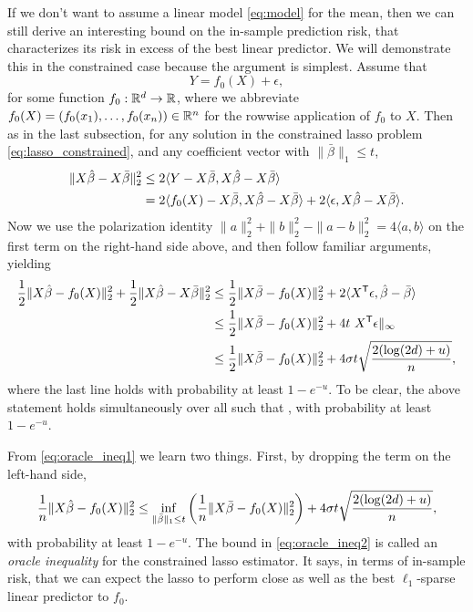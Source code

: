 \documentclass{article}
\begin{document}
If we don't want to assume a linear model \eqref{eq:model} for the mean, then we
can still derive an interesting bound on the in-sample prediction risk, that
characterizes its risk in excess of the best linear predictor. We will
demonstrate this in the constrained case because the argument is
simplest. Assume that 
\[
Y = f_0(X) + \epsilon,
\]  
for some function $f_0 : \mathbb{R}^d \to \mathbb{R}$, where we abbreviate $f_0(X) = (f_0(x_1),
\dots, f_0(x_n)) \in \mathbb{R}^n$ for the rowwise application of $f_0$ to $X$. Then as
in the last subsection, for any solution \smash{$\hbeta$} in the constrained
lasso problem \eqref{eq:lasso_constrained}, and any coefficient vector
\smash{$\bar\beta$} with $\|\bar\beta\|_1 \leq t$,  
\begin{align*}
\|X\hat{\beta} - X\bar\beta\|_2^2 
&\leq 2 \langle Y-X\bar\beta, X\hat{\beta} - X\bar\beta \rangle \\
&= 2 \langle f_0(X) - X\bar\beta, X\hat{\beta} - X\bar\beta \rangle + 
2 \langle \epsilon, X\hat{\beta} - X\bar\beta \rangle.
\end{align*}
Now we use the polarization identity $\|a\|_2^2+\|b\|_2^2-\|a-b\|_2^2 = 4\langle   
a,b\rangle$ on the first term on the right-hand side above, and then follow
familiar arguments, yielding  
\begin{align}
\nonumber
\frac{1}{2} \|X\hbeta - f_0(X)\|_2^2 + \frac{1}{2} \|X\hbeta - X\bar\beta\|_2^2
&\leq \frac{1}{2} \|X\bar\beta - f_0(X)\|_2^2 + 2 \langle X^\T \epsilon, \hbeta 
- \bar\beta \rangle \\
\nonumber
&\leq \frac{1}{2} \|X\bar\beta - f_0(X)\|_2^2 + 4t \ X^\T\epsilon\|_\infty \\
\label{eq:oracle_ineq1}
&\leq \frac{1}{2} \|X\bar\beta - f_0(X)\|_2^2 + 4 \sigma t \sqrt{\frac{2
   (\log(2d) + u)}{n}},   
\end{align}
where the last line holds with probability at least $1-e^{-u}$. To be clear, the
above statement holds simultaneously over all \smash{$\bar\beta$} such that 
, with probability at least $1-e^{-u}$.

From \eqref{eq:oracle_ineq1} we learn two things. First, by dropping the term
 on the left-hand side, 
\begin{equation}
\label{eq:oracle_ineq2}
\frac{1}{n} \|X\hat{\beta} - f_0(X)\|_2^2 \leq \inf_{\|\bar\beta\|_1 \leq t} \bigg(
\frac{1}{n} \|X\bar\beta - f_0(X)\|_2^2 \bigg) + 4 \sigma t \sqrt{\frac{2
    (\log(2d) + u)}{n}},  
\end{equation}
with probability at least $1-e^{-u}$. The bound in \eqref{eq:oracle_ineq2} is
called an \emph{oracle inequality} for the constrained lasso estimator. It says,
in terms of in-sample risk, that we can expect the lasso to perform close as
well as the best $\ell_1$-sparse linear predictor to $f_0$.
\end{document}
